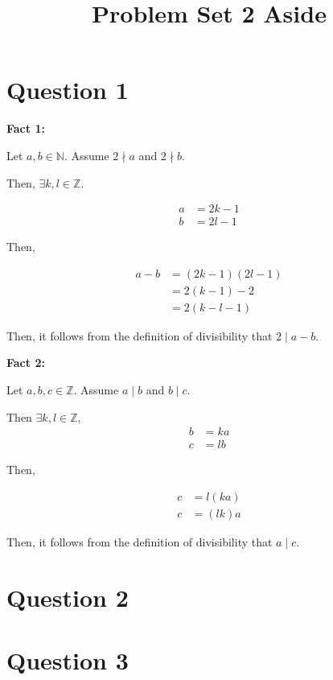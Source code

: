 \documentclass[12pt]{article}
\begin{document}
\title{Problem Set 2 Aside}
\maketitle

\section*{Question 1}

\textbf{Fact 1:}

    \bigskip

    Let $a,b \in \mathbb{N}$. Assume $2 \nmid a$ and $2 \nmid b$.

    \bigskip

    Then, $\exists k,l \in \mathbb{Z}$.

    \begin{align}
        a &= 2k - 1\\
        b &= 2l - 1
    \end{align}

    \bigskip

    Then,

    \begin{align}
        a - b &= (2k-1)(2l-1)\\
        &= 2(k-1)-2\\
        &= 2(k-l-1)
    \end{align}

    \bigskip

    Then, it follows from the definition of divisibility that $2 \mid a-b$.

    \bigskip

    \textbf{Fact 2:}

    \bigskip

    Let $a,b,c \in \mathbb{Z}$. Assume $a \mid b$ and $b \mid c$.

    \bigskip

    Then $\exists k,l \in \mathbb{Z}$,
    \setcounter{equation}{0}
    \begin{align}
        b &= ka\\
        c &= lb
    \end{align}

    \bigskip

    Then,

    \begin{align}
        c &= l(ka)\\
        c &= (lk)a
    \end{align}

    Then, it follows from the definition of divisibility that $a \mid c$.

\section*{Question 2}

\section*{Question 3}
\end{document}
